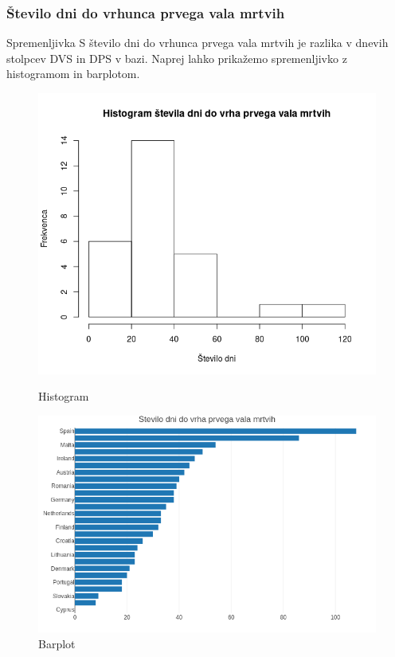\documentclass[a4paper,11pt]{article}
\begin{document}
\subsubsection{Število dni do vrhunca prvega vala mrtvih}
Spremenljivka S število dni do vrhunca prvega vala mrtvih je razlika v dnevih stolpcev DVS in DPS v bazi. Naprej lahko prikažemo spremenljivko z histogramom in barplotom.
\begin{figure}[!htb]
   \begin{minipage}{0.5\textwidth}
     \centering
     \includegraphics[width=1\linewidth]{histogram_st_dni_do_peaka_mrtvih}
     \caption{Histogram}\label{Fig:Data1}
   \end{minipage}\hfill
   \begin{minipage}{0.5\textwidth}
     \centering
     \includegraphics[width=1\linewidth]{barplot_st_dni_do_peaka_mrtvih}
     \caption{Barplot}\label{Fig:Data2}
   \end{minipage}
\end{figure}
\end{document}
